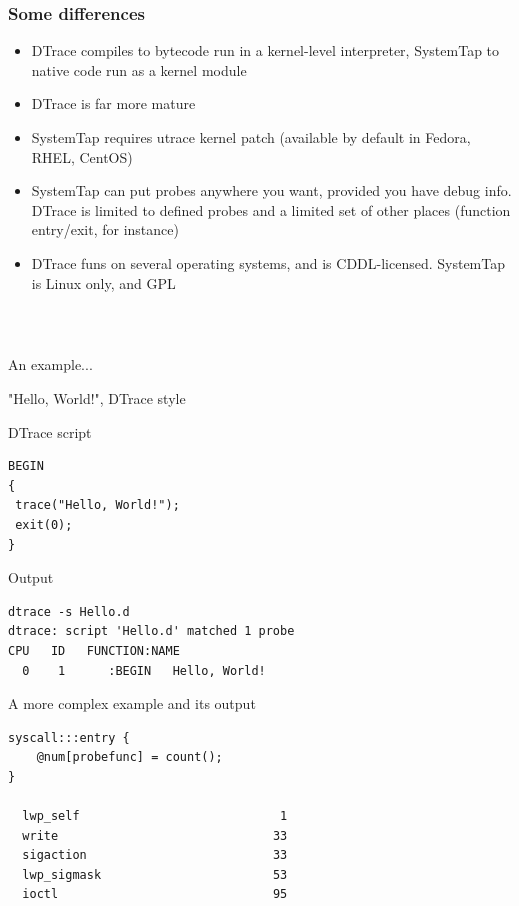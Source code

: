 \documentclass{beamer}
\begin{document}
\begin{frame}
     \frametitle{Some differences}
     \begin{itemize}
         \item DTrace compiles to bytecode run in a kernel-level interpreter, SystemTap to native code run as a kernel module
         \item DTrace is far more mature
         \item SystemTap requires utrace kernel patch (available by default in Fedora, RHEL, CentOS)
         \item SystemTap can put probes anywhere you want, provided you have debug info. DTrace is limited to defined probes and a limited set of other places (function entry/exit, for instance)
         \item DTrace funs on several operating systems, and is CDDL-licensed. SystemTap is Linux only, and GPL
     \end{itemize}
\end{frame}

\begin{frame}
    \frametitle{~}
    An example...
\end{frame}

\begin{frame}[fragile]
    "Hello, World!", DTrace style
    \begin{exampleblock}{DTrace script}
    \begin{lstlisting}
BEGIN 
{ 
 trace("Hello, World!"); 
 exit(0); 
}
    \end{lstlisting}
    \end{exampleblock}

    \begin{exampleblock}{Output}
    \begin{verbatim}
dtrace -s Hello.d 
dtrace: script 'Hello.d' matched 1 probe
CPU   ID   FUNCTION:NAME
  0    1      :BEGIN   Hello, World!
    \end{verbatim}
    \end{exampleblock}
\end{frame}

\begin{frame}[fragile]
    \begin{exampleblock}{A more complex example and its output}
    \begin{lstlisting}
syscall:::entry {
    @num[probefunc] = count();
}

  lwp_self                            1
  write                              33
  sigaction                          33
  lwp_sigmask                        53
  ioctl                              95
    \end{lstlisting}
    \end{exampleblock}
\end{frame}
\end{document}
